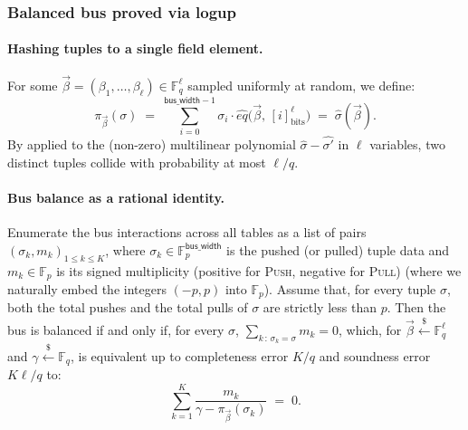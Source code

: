 \documentclass{article}
\theoremstyle{definition}
\newcommand{\Fp}{\mathbb F_p}
\newcommand{\Fq}{\mathbb F_q}
\begin{document}
\subsubsection{Balanced bus proved via logup}

\paragraph{Hashing tuples to a single field element.} For some $\vec\beta = (\beta_1, \ldots, \beta_\ell) \in \Fq^\ell$ sampled uniformly at random, we define:
\[
\pi_{\vec\beta}(\sigma) \;=\; \sum_{i=0}^{\textsf{bus\_width} - 1} \sigma_i \cdot \hat{eq}\big(\vec\beta,\, [i]_\text{bits}^\ell\big) \;=\; \hat{\sigma}(\vec\beta).
\]
By  applied to the (non-zero) multilinear polynomial $\hat\sigma - \hat{\sigma'}$ in $\ell$ variables, two distinct tuples collide with probability at most $\ell/q$.

\paragraph{Bus balance as a rational identity.} Enumerate the bus interactions across all tables as a list of pairs $(\sigma_k, m_k)_{1 \leq k \leq K}$, where $\sigma_k \in \Fp^{\textsf{bus\_width}}$ is the pushed (or pulled) tuple data and $m_k \in \Fp$ is its signed multiplicity (positive for \textsc{Push}, negative for \textsc{Pull}) (where we naturally embed the integers $(-p, p)$ into $\Fp$). Assume that, for every tuple $\sigma$, both the total pushes and the total pulls of $\sigma$ are strictly less than $p$. Then the bus is balanced if and only if, for every $\sigma$, $\sum_{k \,:\, \sigma_k = \sigma} m_k = 0$, which, for $\vec\beta \overset{\$}{\leftarrow} \Fq^\ell$ and $\gamma \overset{\$}{\leftarrow} \Fq$, is equivalent up to completeness error $K / q$ and soundness error $K \ell / q$ to:
\begin{equation} \label{eq:logup-sum}
\sum_{k=1}^{K} \frac{m_k}{\gamma - \pi_{\vec\beta}(\sigma_k)} \;=\; 0.
\end{equation}
\end{document}
